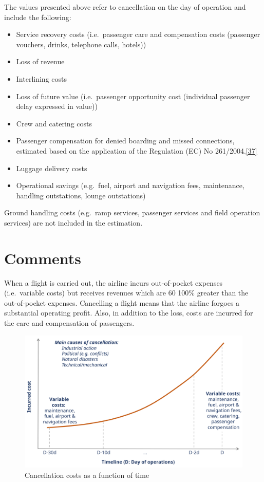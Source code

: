 \documentclass[
  11pt,
  a4paper,
]{book}
\begin{document}
The values presented above refer to cancellation on the day of operation
and include the following:

\begin{itemize}
\item
  Service recovery costs (i.e.~passenger care and compensation costs
  (passenger vouchers, drinks, telephone calls, hotels))
\item
  Loss of revenue
\item
  Interlining costs
\item
  Loss of future value (i.e.~passenger opportunity cost (individual
  passenger delay expressed in value))
\item
  Crew and catering costs
\item
  Passenger compensation for denied boarding and missed connections,
  estimated based on the application of the Regulation (EC) No
  261/2004.\protect\hyperlink{ref-eureg2612004}{{[}37{]}}
\item
  Luggage delivery costs
\item
  Operational savings (e.g.~fuel, airport and navigation fees,
  maintenance, handling outstations, lounge outstations)
\end{itemize}

Ground handling costs (e.g.~ramp services, passenger services and field
operation services) are not included in the estimation.

\hypertarget{comments-6}{%
\section{Comments}\label{comments-6}}

When a flight is carried out, the airline incurs out-of-pocket expenses
(i.e.~variable costs) but receives revenues which are 60 100\% greater
than the out-of-pocket expenses. Cancelling a flight means that the
airline forgoes a substantial operating profit. Also, in addition to the
loss, costs are incurred for the care and compensation of passengers.

\begin{figure}

{\centering \includegraphics{chapters/../figures/cancellation_function.svg}

}

\caption{\label{fig-cancel-function}Cancellation costs as a function of
time}

\end{figure}
\end{document}
